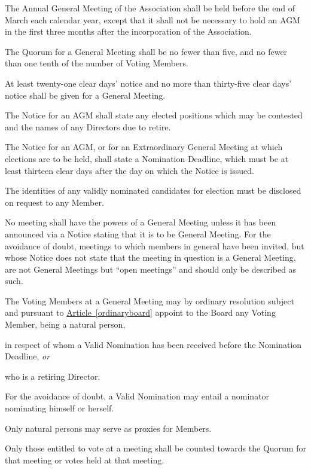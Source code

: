 \documentclass[12pt]{article}
\newcommand{\EC}[0]{Board}
\newcommand{\Exec}[0]{\EC{} }
\newcommand{\avoiddoubt}[0]{For the avoidance of doubt}
\newcommand{\ITor}[0]{\textit{or}}
\newcommand{\articleref}[1]{\hyperref[#1]{Article~\ref*{#1}}}
\begin{document}
\begin{constenum}

  \item The Annual General Meeting of the Association shall be
    held before the end of March each calendar year, except that it shall
    not be necessary to hold an AGM in the first three months after
    the incorporation of the Association.

  \item The Quorum for a General Meeting shall be no fewer than five, and
    no fewer than one tenth of the number of Voting Members.

  \item At least twenty-one clear days' notice and no more than
    thirty-five clear days' notice shall be given for a General
    Meeting.

  \item The Notice for an AGM shall state any elected positions which
    may be contested and the names of any Directors due to retire.

  \item The Notice for an AGM, or for an Extraordinary General Meeting
    at which elections are to be held, shall state a Nomination
    Deadline, which must be at least thirteen clear days after the day
    on which the Notice is issued.

  \item The identities of any validly nominated candidates for
    election must be disclosed on request to any Member.

  \item No meeting shall have the powers of a General Meeting unless
    it has been announced via a Notice stating that it is to be
    General Meeting.  \avoiddoubt, meetings to which members in
    general have been invited, but whose Notice does not state that
    the meeting in question is a General Meeting, are not General
    Meetings but ``open meetings'' and should only be described as such.

  \item The Voting Members at a General Meeting may by ordinary
    resolution subject and pursuant to \articleref{ordinaryboard}
    appoint to the \Exec any Voting Member, being a natural person,
    \begin{constenum}
      \item in respect of whom a Valid Nomination has been received
        before the Nomination Deadline, \ITor
      \item who is a retiring Director.
    \end{constenum}

  \item \avoiddoubt, a Valid Nomination may entail a nominator nominating
    himself or herself.

  \item Only natural persons may serve as proxies for Members.

  \item Only those entitled to vote at a meeting shall be counted towards
    the Quorum for that meeting or votes held at that meeting.

\end{constenum}
\end{document}
